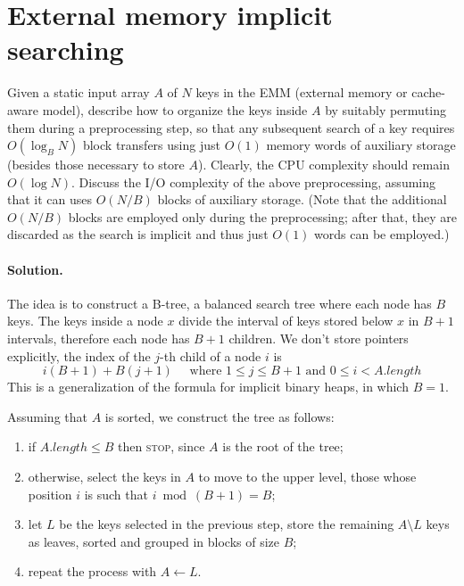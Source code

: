 \section{External memory implicit searching}
Given a static input array $A$ of $N$ keys in the EMM (external memory or cache-aware model), describe how to organize the keys inside $A$ by suitably permuting them during a preprocessing step, so that any subsequent search of a key requires $O(\log_B N)$ block transfers using just $O(1)$ memory words of auxiliary storage (besides those necessary to store $A$). Clearly, the CPU complexity should remain $O(\log N)$. Discuss the I/O complexity of the above preprocessing, assuming that it can uses $O(N/B)$ blocks of auxiliary storage. (Note that the additional $O(N/B)$ blocks are employed only during the preprocessing; after that, they are discarded as the search is implicit and thus just $O(1)$ words can be employed.)

\vspace{0.5cm}
\paragraph{Solution.} The idea is to construct a B-tree, a balanced search tree where each node has $B$ keys. The keys inside a node $x$ divide the interval of keys stored below $x$ in $B+1$ intervals, therefore each node has $B+1$ children. We don't store pointers explicitly, the index of the $j$-th child of a node $i$ is
$$i(B+1)+B(j+1) \quad \text{ where } 1 \leq j \leq B+1 \text{ and } 0 \leq i < A.length$$
This is a generalization of the formula for implicit binary heaps, in which $B=1$.

Assuming that $A$ is sorted, we construct the tree as follows:
\begin{enumerate}
  \item if $A.length \leq B$ then \textsc{stop}, since $A$ is the root of the tree;
  \item otherwise, select the keys in $A$ to move to the upper level, those whose position $i$ is such that $i \bmod (B+1) = B$;
  \item let $L$ be the keys selected in the previous step, store the remaining $A \setminus L$ keys as leaves, sorted and grouped in blocks of size $B$;
  \item repeat the process with $A \gets L$.
\end{enumerate}

